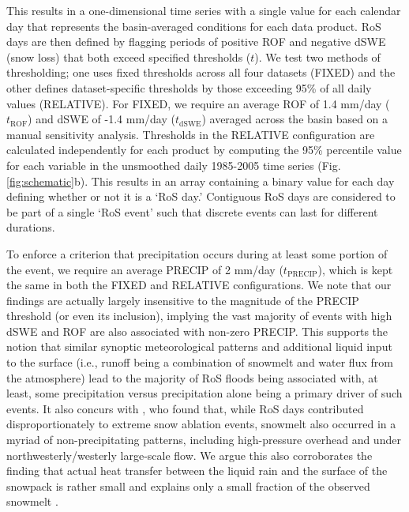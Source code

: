 \documentclass[nhess, manuscript]{copernicus}
\begin{document}
This results in a one-dimensional time series with a single value for each calendar day that represents the basin-averaged conditions for each data product.
RoS days are then defined by flagging periods of positive ROF and negative dSWE (snow loss) that both exceed specified thresholds ($t$).
We test two methods of thresholding; one uses fixed thresholds across all four datasets (FIXED) and the other defines dataset-specific thresholds by those exceeding 95\% of all daily values (RELATIVE).
For FIXED, we require an average ROF of 1.4 mm/day ($t_{\textrm{ROF}}$) and dSWE of -1.4 mm/day ($t_{\textrm{dSWE}}$) averaged across the basin based on a manual sensitivity analysis.
Thresholds in the RELATIVE configuration are calculated independently for each product by computing the 95\% percentile value for each variable in the unsmoothed daily 1985-2005 time series (Fig. \ref{fig:schematic}b).
This results in an array containing a binary value for each day defining whether or not it is a `RoS day.'
Contiguous RoS days are considered to be part of a single `RoS event' such that discrete events can last for different durations.

To enforce a criterion that precipitation occurs during at least some portion of the event, we require an average PRECIP of 2 mm/day ($t_{\textrm{PRECIP}}$), which is kept the same in both the FIXED and RELATIVE configurations.
We note that our findings are actually largely insensitive to the magnitude of the PRECIP threshold (or even its inclusion), implying the vast majority of events with high dSWE and ROF are also associated with non-zero PRECIP.
This supports the notion that similar synoptic meteorological patterns \citep{grote2021synoptic} and additional liquid input to the surface (i.e., runoff being a combination of snowmelt and water flux from the atmosphere) lead to the majority of RoS floods being associated with, at least, some precipitation versus precipitation alone being a primary driver of such events.
It also concurs with \citet{suriano2023atmospheric}, who found that, while RoS days contributed disproportionately to extreme snow ablation events, snowmelt also occurred in a myriad of non-precipitating patterns, including high-pressure overhead and under northwesterly/westerly large-scale flow.
We argue this also corroborates the finding that actual heat transfer between the liquid rain and the surface of the snowpack is rather small and explains only a small fraction of the observed snowmelt \citep{moore1984controls}.
\end{document}

